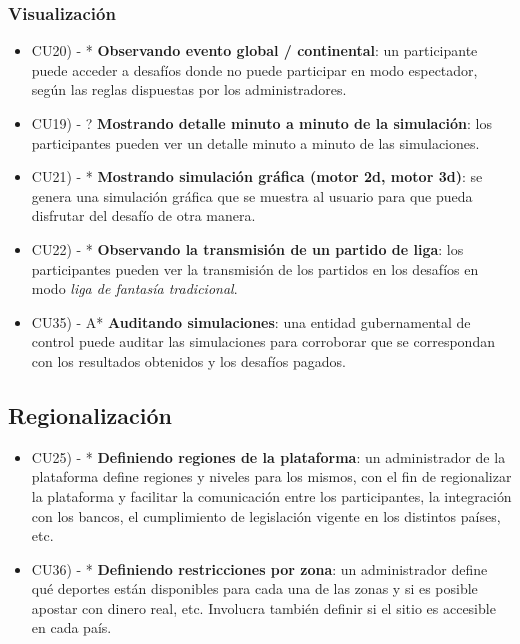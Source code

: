 \subsubsection{Visualización}
\begin{itemize}
\item CU20) - * \textbf{Observando evento global / continental}: un participante puede acceder a desafíos donde no puede participar en modo espectador, según las reglas dispuestas por los administradores.

\item CU19) - ? \textbf{Mostrando detalle minuto a minuto de la simulación}: los participantes pueden ver un detalle minuto a minuto de las simulaciones.

\item CU21) - * \textbf{Mostrando simulación gráfica (motor 2d, motor 3d)}: se genera una simulación gráfica que se muestra al usuario para que pueda disfrutar del desafío de otra manera.

\item CU22) - * \textbf{Observando la transmisión de un partido de liga}: los participantes pueden ver la transmisión de los partidos en los desafíos en modo \emph{liga de fantasía tradicional}.

\item CU35) - A* \textbf{Auditando simulaciones}: una entidad gubernamental de control puede auditar las simulaciones para corroborar que se correspondan con los resultados obtenidos y los desafíos pagados.

\end{itemize}


\subsection{Regionalización}
\begin{itemize}
\item CU25) - * \textbf{Definiendo regiones de la plataforma}: un administrador de la plataforma define regiones y niveles para los mismos, con el fin de regionalizar la plataforma y facilitar la comunicación entre los participantes, la integración con los bancos, el cumplimiento de legislación vigente en los distintos países, etc.

\item CU36) - * \textbf{Definiendo restricciones por zona}: un administrador define qué deportes están disponibles para cada una de las zonas y si es posible apostar con dinero real, etc. Involucra también definir si el sitio es accesible en cada país.
\end{itemize}






